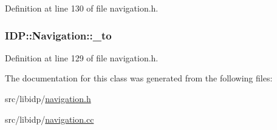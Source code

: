 Definition at line 130 of file navigation.h.

\hypertarget{classIDP_1_1Navigation_a76df45b8316e55560e1adc9165700d0f}{
\subsubsection[{\_\-to}]{ {\bf IDP::Navigation::\_\-to}}}
\label{classIDP_1_1Navigation_a76df45b8316e55560e1adc9165700d0f}


Definition at line 129 of file navigation.h.



The documentation for this class was generated from the following files:\begin{DoxyCompactItemize}
\item 
src/libidp/\hyperlink{navigation_8h}{navigation.h}\item 
src/libidp/\hyperlink{navigation_8cc}{navigation.cc}\end{DoxyCompactItemize}
